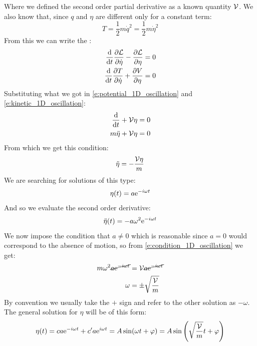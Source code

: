 Where we defined the second order partial derivative as a known quantity $\mathcal{V}$. We also know that, since $q$ and $\eta$ are different only for a constant term:
\begin{equation} \label{e:kinetic_1D_oscillation}
    T = \dfrac{1}{2}m\dot{q}^2 = \dfrac{1}{2}m\dot{\eta}^2
\end{equation}
From this we can write the \eleref :
\begin{equation}
    \begin{split}
        \dv{}{t}\pdv{\lagr}{\dot{\eta}} -\pdv{\lagr}{\eta} = 0 \\
        \dv{}{t}\pdv{T}{\dot{\eta}} + \pdv{V}{\eta} = 0
    \end{split}
\end{equation}
Substituting what we got in \eqref{e:potential_1D_oscillation} and \eqref{e:kinetic_1D_oscillation}:
\begin{equation}
    \begin{split}
        \dv{}{t}(m\dot{\eta}) + \Velegant\eta &= 0\\
        m\ddot{\eta} + \Velegant\eta &= 0
    \end{split}
\end{equation}
From which we get this condition:
\begin{equation} \label{e:condition_1D_oscillation}
    \ddot{\eta} =- \dfrac{\mathcal{V}\eta}{m}
\end{equation}
We are searching for solutions of this type:
\begin{equation}
    \eta (t) = a\mathrm{e}^{-i\omega t}
\end{equation}
And so we evaluate the second order derivative:
\begin{eqnarray}
    \ddot{\eta} (t) = -a\omega^2\mathrm{e}^{-i\omega t}
\end{eqnarray}
We now impose the condition that $a\neq 0$ which is reasonable since $a=0$ would correspond to the absence of motion, so from \eqref{e:condition_1D_oscillation} we get:
\begin{equation}
    \begin{split}
        m\omega^2\cancel{a\mathrm{e}^{-i\omega t}} &= \mathcal{V}\cancel{a\mathrm{e}^{-i\omega t}}\\
        \omega &= \pm \sqrt{\dfrac{\mathcal{V}}{m}}
    \end{split}
\end{equation}
By convention we usually take the $+$ sign and refer to the other solution as $-\omega$. The general solution for $\eta$ will be of this form:
\begin{equation}
    \eta (t) = ca\mathrm{e}^{-i\omega t} + c'a\mathrm{e}^{i\omega t} = A \sin(\omega t + \varphi) = A \sin\left(\sqrt{\dfrac{\mathcal{V}}{m}} t + \varphi\right)
\end{equation}
